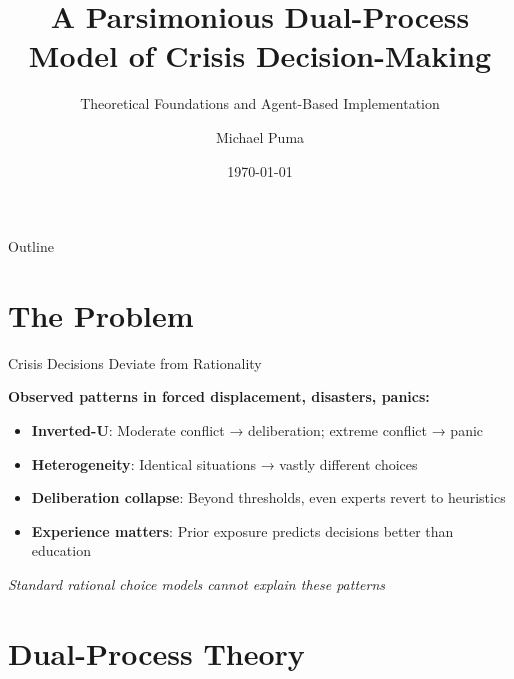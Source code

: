\documentclass[aspectratio=169]{beamer}
\title[Dual-Process Crisis Model]{A Parsimonious Dual-Process Model of Crisis Decision-Making}
\subtitle{Theoretical Foundations and Agent-Based Implementation}
\author{Michael Puma}
\institute{Columbia University Climate School\\Center for Climate Systems Research}
\date{\today}
\begin{document}
\begin{frame}
\titlepage
\end{frame}

\begin{frame}{Outline}
\tableofcontents
\end{frame}

\section{The Problem}

\begin{frame}{Crisis Decisions Deviate from Rationality}

\textbf{Observed patterns in forced displacement, disasters, panics:}

\begin{itemize}
    \item \textbf{Inverted-U}: Moderate conflict → deliberation; extreme conflict → panic
    \item \textbf{Heterogeneity}: Identical situations → vastly different choices  
    \item \textbf{Deliberation collapse}: Beyond thresholds, even experts revert to heuristics
    \item \textbf{Experience matters}: Prior exposure predicts decisions better than education
\end{itemize}

\vspace{0.5em}
\centering
\textit{Standard rational choice models cannot explain these patterns}

\end{frame}

\section{Dual-Process Theory}
\end{document}
